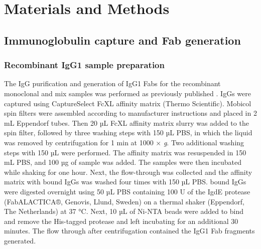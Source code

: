 \section{Materials and Methods}

\subsection{Immunoglobulin capture and Fab generation}
\label{ch:ig-capt}

\subsubsection{Recombinant IgG1 sample preparation}
The IgG purification and generation of IgG1 Fabs for the recombinant monoclonal and mix samples was performed as previously published \cite{bondt2021human}. IgGs were captured using CaptureSelect FcXL affinity matrix (Thermo Scientific). Mobicol spin filters were assembled according to manufacturer instructions and placed in 2 mL Eppendorf tubes. Then 20 µL FcXL affinity matrix slurry was added to the spin filter, followed by three washing steps with 150 µL PBS, in which the liquid was removed by centrifugation for 1 min at 1000 × \emph{g}. Two additional washing steps with 150 µL were performed. The affinity matrix was resuspended in 150 mL PBS, and 100 µg of sample was added. The samples were then incubated while shaking for one hour. Next, the flow-through was collected and the affinity matrix with bound IgGs was washed four times with 150 µL PBS. bound IgGs were digested overnight using 50 µL PBS containing 100 U of the IgdE protease (FabALACTICA®, Genovis, Llund, Sweden) on a thermal shaker (Eppendorf, The Netherlands) at 37 °C. Next, 10 µL of Ni-NTA beads were added to bind and remove the His-tagged protease and left incubating for an additional 30 minutes. The flow through after centrifugation contained the IgG1 Fab fragments generated.

